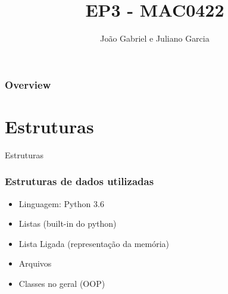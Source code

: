 \documentclass{beamer}
\title[EP3]{EP3 - MAC0422} %
\author{João Gabriel e Juliano Garcia} %
\institute[IME- USP] %
{
Instituto de Matemática e Estatística - USP \\ %
}
\date{} %
\begin{document}
\begin{frame}
\titlepage %
\end{frame}

\begin{frame}
\frametitle{Overview} %
\tableofcontents %
\end{frame}


\section{Estruturas}

\begin{frame}
\begin{center}
\huge Estruturas
\end{center}
\end{frame}

\begin{frame}
\frametitle{Estruturas de dados utilizadas}
\begin{itemize}
\item Linguagem: Python 3.6
\item Listas (built-in do python)
\item Lista Ligada (representação da memória)
\item Arquivos
\item Classes no geral (OOP)
\end{itemize}
\end{frame}
\end{document}
